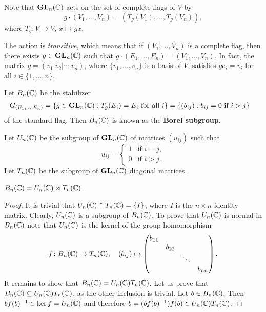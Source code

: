 Note that $\mathbf{GL}_n(\mathbb{C})$ acts on the set of complete flags of $V$ 
by 
\[
g\cdot (V_1,\dots,V_n)=(T_g(V_1),\dots,T_g(V_n)),
\]
where $T_g\colon V\to V$, $x\mapsto gx$. 

The action is \emph{transitive}, 
which means that if $(V_1,\dots,V_n)$ 
is a complete flag, then there exists 
$g\in\mathbf{GL}_n(\mathbb{C})$ such that $g\cdot (E_1,\dots,E_n)=(V_1,\dots,V_n)$. 
In fact, 
the matrix $g=(v_1|v_2|\cdots|v_n)$, where
$\{v_1,\dots,v_n\}$ is a basis of $V$, 
satisfies $ge_i=v_i$ for all $i\in\{1,\dots,n\}$. 

\label{Borel subgroup}
Let $B_n(\mathbb{C})$ be the stabilizer    
\begin{align*}
G_{(E_1,\dots,E_n)}
&=\{g\in\mathbf{GL}_n(\mathbb{C}):T_g(E_i)=E_i\text{ for all $i$}\}
=\{(b_{ij}):b_{ij}=0\text{ if $i>j$}\}
\end{align*}
of the standard flag. Then $B_n(\mathbb{C})$ is 
known as the \textbf{Borel subgroup}. 

Let $U_n(\mathbb{C})$ be the subgroup of $\mathbf{GL}_n(\mathbb{C})$ 
of matrices $(u_{ij})$ such that 
\[
u_{ij}=\begin{cases}
1&\text{if $i=j$},\\
0&\text{if $i>j$}.\end{cases}
\]
Let $T_n(\mathbb{C})$ be the subgroup of $\mathbf{GL}_n(\mathbb{C})$ diagonal matrices. 

\begin{proposition}
    $B_n(\mathbb{C})=U_n(\mathbb{C})\rtimes T_n(\mathbb{C})$. 
\end{proposition}

\begin{proof}
    It is trivial that $U_n(\mathbb{C})\cap T_n(\mathbb{C})=\{I\}$, where $I$ is the 
    $n\times n$ identity matrix. Clearly, $U_n(\mathbb{C})$ is a subgroup of $B_n(\mathbb{C})$.
    To prove that 
    $U_n(\mathbb{C})$ is normal in $B_n(\mathbb{C})$ note that $U_n(\mathbb{C})$ is the kernel
    of the group homomorphism
    \[
    f\colon B_n(\mathbb{C})\to T_n(\mathbb{C}),\quad
    (b_{ij})\mapsto\begin{pmatrix}
        b_{11}\\
        &b_{22}\\
        &&\ddots\\
        &&&b_{nn}
    \end{pmatrix}.
    \]
    It remains to show that $B_n(\mathbb{C})=U_n(\mathbb{C})T_n(\mathbb{C})$.
    Let us prove that  $B_n(\mathbb{C})\subseteq U_n(\mathbb{C})T_n(\mathbb{C})$, as the other inclusion is trivial. 
    Let $b\in B_n(\mathbb{C})$. Then
    $bf(b)^{-1}\in \ker f=U_n(\mathbb{C})$ and therefore  
    $b=(bf(b)^{-1})f(b)\in U_n(\mathbb{C})T_n(\mathbb{C})$. 
\end{proof}

